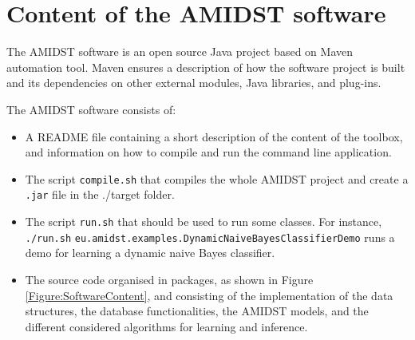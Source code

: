 \section{Content of the AMIDST software} \label{sec:Content}

The AMIDST software is an open source Java project based on Maven automation tool. Maven ensures a description of how the software project is built and its dependencies on other external modules, Java libraries, and plug-ins.  

The AMIDST software consists of:

\begin{itemize}

\item A README file containing a short description of the content of the toolbox, and information on how to compile and run the command line application.

\item The script \texttt{compile.sh} that compiles the whole AMIDST project and create a \texttt{.jar} file in the ./target folder.

\item The script \texttt{run.sh} that should be used to run some classes. For instance, \texttt{./run.sh} \texttt{eu.amidst.examples.DynamicNaiveBayesClassifierDemo} runs a demo for learning a dynamic naive Bayes classifier.

\item The source code organised in packages, as shown in Figure \ref{Figure:SoftwareContent}, and consisting of the implementation of the data structures, the database functionalities, the AMIDST models, and the different considered algorithms for learning and inference. 

\end{itemize}


